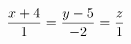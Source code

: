 \documentclass[preview]{standalone}
\begin{document}
\begin{align*}
\special{dvisvgm:raw <g id='unique000'>}\dfrac{x+4}{1}=\dfrac{y-5}{-2}=\dfrac{z}{1}\special{dvisvgm:raw </g>}
\end{align*}
\end{document}
